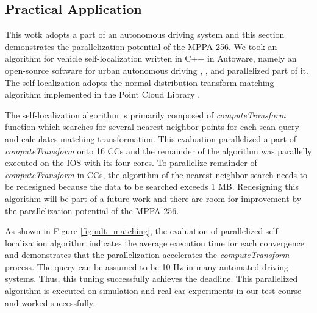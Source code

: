 \documentclass[conference,compsoc]{IEEEtran}
\begin{document}
\vspace{-3mm}
\subsection{Practical Application}
\label{sec:practical_application}
\vspace{-3mm}
This wotk adopts a part of an autonomous driving system and this section demonstrates the parallelization potential of the MPPA-256.
We took an algorithm for vehicle self-localization written in C++ in Autoware, namely an open-source software for urban autonomous driving \cite{autoware}, \cite{kato2015open}, and parallelized part of it.
The self-localization adopts the normal-distribution transform matching algorithm \cite{magnusson2009three} implemented in the Point Cloud Library \cite{pcl}.


The self-localization algorithm is primarily composed of \emph{computeTransform} function which searches for several nearest neighbor points for each scan query and calculates matching transformation.
This evaluation parallelized a part of \emph{computeTransform} onto 16 CCs and the remainder of the algorithm was parallelly executed on the IOS with its four cores.
To parallelize remainder of \emph{computeTransform} in CCs, the algorithm of the nearest neighbor search needs to be redesigned because the data to be searched exceeds 1 MB.
Redesigning this algorithm will be part of a future work and there are room for improvement by the parallelization potential of the MPPA-256.

As shown in Figure \ref{fig:ndt_matching}, the evaluation of parallelized self-localization algorithm indicates the average execution time for each convergence and demonstrates that the parallelization accelerates the \emph{computeTransform} process.
The query can be assumed to be 10 Hz in many automated driving systems.
Thus, this tuning successfully achieves the deadline.
This parallelized algorithm is executed on simulation and real car experiments in our test course and worked successfully.
\end{document}
